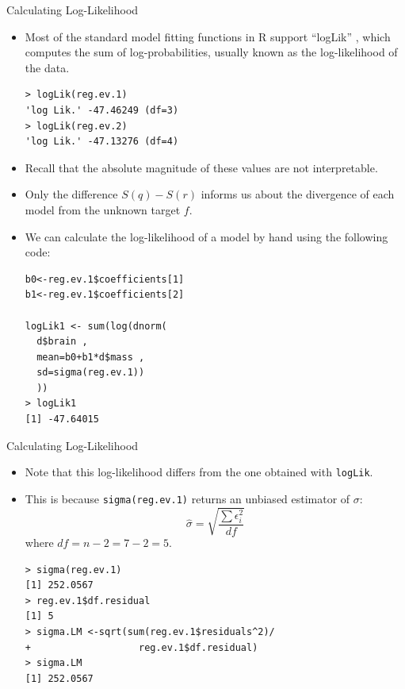 \documentclass[handout]{beamer}
\begin{document}
\begin{frame}[fragile]{Calculating Log-Likelihood}
\scriptsize{

\begin{itemize}




\item Most of the standard model fitting functions in R support ``logLik'' , which computes the sum of log-probabilities, usually known as the log-likelihood of the data.

\begin{verbatim}
> logLik(reg.ev.1)
'log Lik.' -47.46249 (df=3)
> logLik(reg.ev.2)
'log Lik.' -47.13276 (df=4) 
\end{verbatim}

\item Recall that the absolute magnitude of these values are not interpretable.

\item Only the difference  $S(q) - S(r)$ informs us about the divergence of each model from the unknown target $f$.

\item We can calculate the log-likelihood of a model by hand using the following code:

\begin{verbatim}
b0<-reg.ev.1$coefficients[1]
b1<-reg.ev.1$coefficients[2]

logLik1 <- sum(log(dnorm(
  d$brain ,
  mean=b0+b1*d$mass ,
  sd=sigma(reg.ev.1))
  ))
> logLik1
[1] -47.64015
\end{verbatim}


\end{itemize}


} 
\end{frame}

\begin{frame}[fragile]{Calculating Log-Likelihood}
\scriptsize{

\begin{itemize}




\item Note that this log-likelihood differs from the one obtained with \verb+logLik+.

\item This is because \verb+sigma(reg.ev.1)+ returns an unbiased estimator of $\sigma$: \begin{displaymath}
   \hat{\sigma} = \sqrt{\frac{\sum \epsilon_i^2}{df}}
                                                                                        \end{displaymath}
where $df=n-2=7-2=5$.

\begin{verbatim}
> sigma(reg.ev.1)
[1] 252.0567
> reg.ev.1$df.residual
[1] 5
> sigma.LM <-sqrt(sum(reg.ev.1$residuals^2)/
+                   reg.ev.1$df.residual)
> sigma.LM
[1] 252.0567
\end{verbatim}



\end{itemize}


}
\end{frame}
\end{document}
